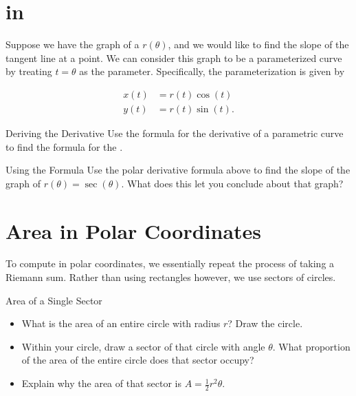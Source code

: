 \section{ in }
Suppose we have the graph of a  $r(\theta)$, and we would like to find the slope of the tangent line at a point.  We can consider this graph to be a parameterized curve by treating $t=\theta$ as the parameter.  Specifically, the parameterization is given by

\begin{center}
\begin{align*}
x(t)&=r(t)\cos(t)\\
y(t)&=r(t)\sin(t).
\end{align*}
\end{center}

\begin{exercise}{Deriving the Derivative \Coffeecup \Coffeecup}
Use the formula for the derivative of a parametric curve to find the formula for the . \vspace*{1in} 
\end{exercise}

\begin{exercise}{Using the Formula \Coffeecup \Coffeecup}
Use the polar derivative formula above to find the slope of the graph of $r(\theta)=\sec(\theta)$.  What does this let you conclude about that graph? \vspace*{2in}
\end{exercise}

\section{Area in Polar Coordinates}

To compute  in polar coordinates, we essentially repeat the process of taking a Riemann sum.  Rather than using rectangles however, we use sectors of circles. 

\begin{exercise}{Area of a Single Sector \Coffeecup \Coffeecup}
\begin{itemize}
\item What is the area of an entire circle with radius $r$?  Draw the circle.  \vspace*{.5in}
\item Within your circle, draw a sector of that circle with angle $\theta$.  What proportion of the area of the entire circle does that sector occupy? \vspace*{.5in}
\item Explain why the area of that sector is $A=\frac{1}{2}r^2\theta.$ \vspace*{.5in}
\end{itemize}
\end{exercise}

